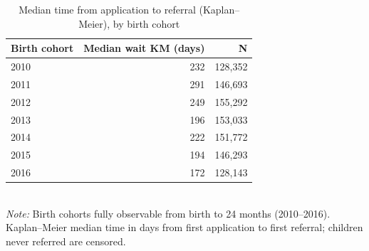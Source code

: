 \begin{table}[htbp]\centering
\caption{Median time from application to referral (Kaplan--Meier), by birth cohort}
\label{tab:S4a_espera_coorte}
\small
\begin{tabular}{lrr}
\toprule
Birth cohort & Median wait KM (days) & N \\
\midrule
2010 & 232 & 128,352 \\
2011 & 291 & 146,693 \\
2012 & 249 & 155,292 \\
2013 & 196 & 153,033 \\
2014 & 222 & 151,772 \\
2015 & 194 & 146,293 \\
2016 & 172 & 128,143 \\
\bottomrule
\end{tabular}
\\[3pt]{\footnotesize \textit{Note:} Birth cohorts fully observable from birth to 24 months (2010--2016). Kaplan--Meier median time in days from first application to first referral; children never referred are censored.}
\end{table}
